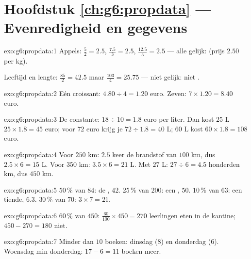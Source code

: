 \section*{Hoofdstuk \ref{ch:g6:propdata} --- Evenredigheid en gegevens}

\begin{solution}{exo:g6:propdata:1}
Appels:  $\frac52 = 2.5$, $\frac{7.5}{3} = 2.5$,
$\frac{12.5}{5} = 2.5$ --- alle gelijk:  (prijs $2.50$ per kg).

Leeftijd en lengte: $\frac{85}{2} = 42.5$ maar $\frac{103}{4} = 25.75$ --- niet
gelijk: niet .
\end{solution}

\begin{solution}{exo:g6:propdata:2}
Eén croissant: $4.80 \div 4 = 1.20$ euro. Zeven: $7 \times 1.20 = 8.40$ euro.
\end{solution}

\begin{solution}{exo:g6:propdata:3}
De constante: $18 \div 10 = 1.8$ euro per liter. Dan kost $25$ L
$25 \times 1.8 = 45$ euro; voor $72$ euro krijg je $72 \div 1.8 = 40$ L; $60$ L
kost $60 \times 1.8 = 108$ euro.
\end{solution}

\begin{solution}{exo:g6:propdata:4}
Voor $250$ km: $2.5$ keer de brandstof van $100$ km, dus $2.5 \times 6 = 15$ L.
Voor $350$ km: $3.5 \times 6 = 21$ L. Met $27$ L: $27 \div 6 = 4.5$ honderden
km, dus $450$ km.
\end{solution}

\begin{solution}{exo:g6:propdata:5}
$50\,\%$ van $84$: de , $42$. \quad
$25\,\%$ van $200$: een , $50$. \quad
$10\,\%$ van $63$: een tiende, $6.3$. \quad
$30\,\%$ van $70$: $3 \times 7 = 21$.
\end{solution}

\begin{solution}{exo:g6:propdata:6}
$60\,\%$ van $450$: $\frac{60}{100} \times 450 = 270$ leerlingen eten in de
kantine; $450 - 270 = 180$ niet.
\end{solution}

\begin{solution}{exo:g6:propdata:7}
Minder dan $10$ boeken: dinsdag ($8$) en donderdag ($6$). Woensdag min donderdag:
$17 - 6 = 11$ boeken meer.
\end{solution}

